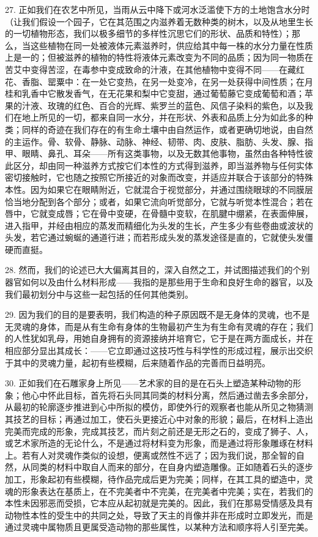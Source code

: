 27. 正如我们在农艺中所见，当雨从云中降下或河水泛滥使下方的土地饱含水分时（让我们假设一个园子，它在其范围之内滋养着无数种类的树木，以及从地里生长的一切植物形态，我们以极多细节的多样性沉思它们的形状、品质和特性）；那么，当这些植物在同一处被液体元素滋养时，供应给其中每一株的水分力量在性质上是一的；但被滋养的植物的特性将液体元素改变为不同的品质；因为同一物质在苦艾中变得苦涩，在毒参中变成致命的汁液，在其他植物中变得不同——在藏红花、香脂、罂粟中：在一处它变热，在另一处变冷，在另一处获得中间性质；在月桂和乳香中它散发香气，在无花果和梨中它变甜，通过葡萄藤它变成葡萄和酒；苹果的汁液、玫瑰的红色、百合的光辉、紫罗兰的蓝色、风信子染料的紫色，以及我们在地上所见的一切，都来自同一水分，并在形状、外表和品质上分为如此多的种类；同样的奇迹在我们存在的有生命土壤中由自然运作，或者更确切地说，由自然的主运作。骨、软骨、静脉、动脉、神经、韧带、肉、皮肤、脂肪、头发、腺、指甲、眼睛、鼻孔、耳朵——所有这类事物，以及无数其他事物，虽然由各种特性彼此区分，却由同一种滋养方式按它们本性的方式得到滋养，即当滋养物与任何实体密切接触时，它也随之按照它所接近的对象而改变，并适应并联合于该部分的特殊本性。因为如果它在眼睛附近，它就混合于视觉部分，并通过围绕眼球的不同膜层恰当地分配到各个部分；或者，如果它流向听觉部分，它就与听觉本性混合；若在唇中，它就变成唇；它在骨中变硬，在骨髓中变软，在肌腱中绷紧，在表面伸展，进入指甲，并经由相应的蒸发而精细化为头发的生长，产生多少有些卷曲或波状的头发，若它通过蜿蜒的通道行进；而若形成头发的蒸发途径是直的，它就使头发僵硬而直挺。\par

28. 然而，我们的论述已大大偏离其目的，深入自然之工，并试图描述我们的个别器官如何以及由什么材料形成——我指的是那些用于生命和良好生命的器官，以及我们最初划分中与这些一起包括的任何其他类别。\par

29. 因为我们的目的是要表明，我们构造的种子原因既不是无身体的灵魂，也不是无灵魂的身体，而是从有生命有身体的生物最初产生为有生命有灵魂的存在；我们的人性犹如乳母，用她自身拥有的资源接纳并培育它，它于是在两方面成长，并在相应部分显出其成长：——它立即通过这技巧性与科学性的形成过程，展示出交织于其中的灵魂力量，起初有些模糊，后来随着作品的完善而日益明亮。\par

30. 正如我们在石雕家身上所见——艺术家的目的是在石头上塑造某种动物的形象；他心中怀此目标，首先将石头同其同类的材料分离，然后通过凿去多余部分，从最初的轮廓逐步推进到心中所拟的模仿，即使外行的观察者也能从所见之物猜测其技艺的目标；再通过加工，使石头更接近心中对象的形貌；最后，在材料上造出完美而完成的形象，完成其技艺，而片刻之前还是无形之石的，变成了狮子、人，或艺术家所造的无论什么，不是通过将材料变为形象，而是通过将形象雕琢在材料上。若有人对灵魂作类似的设想，便离或然性不远了；因为我们说，那全智的自然，从同类的材料中取自人而来的部分，在自身内塑造雕像。正如随着石头的逐步加工，形象起初有些模糊，待作品完成后更为完美；同样，在其工具的塑造中，灵魂的形象表达在基质上，在不完美者中不完美，在完美者中完美；实在，若我们的本性未因邪恶而受损，它本应从起初就是完美的。因此，我们在那易受情感及具有动物性本性的受生中的共同之处，导致了天主的肖像并非在形成时立即发光，而是通过灵魂中属物质且更属受造动物的那些属性，以某种方法和顺序将人引至完美。\par

